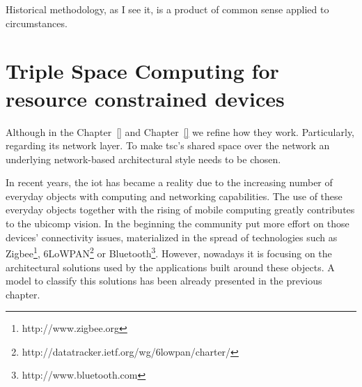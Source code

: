 

\begin{savequote}[50mm]
Historical methodology, as I see it, is a product of common sense applied to circumstances. 
\end{savequote}


\newcommand{\codigo}[1]{``\texttt{#1}''}
\newcommand{\primquery}{\emph{query}}
\newcommand{\primread}{\emph{read}}
\newcommand{\primtake}{\emph{take}}
\newcommand{\primwrite}{\emph{write}}


\chapter{Triple Space Computing for resource constrained devices}
\label{cha:tsc}
\newcommand{\pathchapthree}{3_tsc}

\ifpdf
    \graphicspath{{\pathchapthree/figures/PNG/}{\pathchapthree/figures/PDF/}{\pathchapthree/figures/}}
\else
    \graphicspath{{\pathchapthree/figures/EPS/}{\pathchapthree/figures/}}
\fi







Although in the Chapter~\ref{} and Chapter~\ref{} we refine how they work.
Particularly, 
regarding its network layer.
To make \ac{tsc}'s shared space over the network an underlying network-based architectural style needs to be chosen.


In recent years, the \acf{iot} has became a reality due to the increasing number of everyday objects with computing and networking capabilities.
The use of these everyday objects together with the rising of mobile computing greatly contributes to the \ac{ubicomp} vision.
In the beginning the community put more effort on those devices' connectivity issues, materialized in the spread of technologies such as Zigbee\footnote{http://www.zigbee.org}, 6LoWPAN\footnote{http://datatracker.ietf.org/wg/6lowpan/charter/} or Bluetooth\footnote{http://www.bluetooth.com}.
However, nowadays it is focusing on the architectural solutions used by the applications built around these objects.
A model to classify this solutions has been already presented in the previous chapter. %


